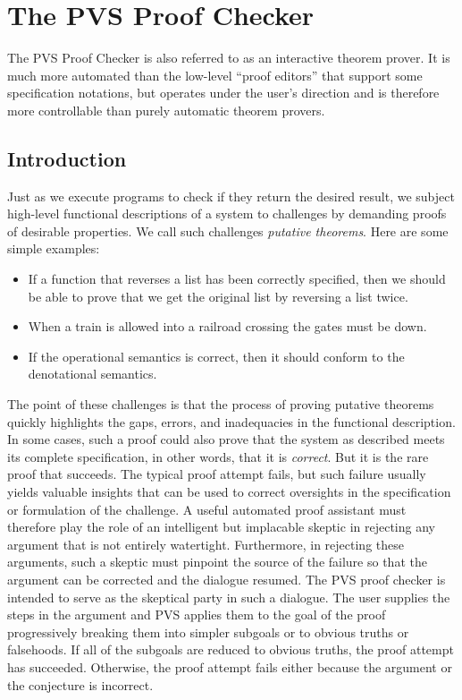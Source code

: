
\section{The PVS Proof Checker}

The PVS Proof Checker is also referred to as an interactive theorem
prover.  It is much more automated than the low-level ``proof
editors'' that support some specification notations, but operates
under the user's direction and is therefore more controllable than
purely automatic theorem provers.


\subsection{Introduction}

Just as we execute programs to check if they return the desired result,
we subject high-level functional descriptions of a system to challenges
by demanding proofs of desirable properties.  We call such challenges
{\em putative theorems}.  Here are some simple examples:
\begin{itemize}
  \item If a function that reverses a list has been
correctly specified, then we should be able to prove that we get the
original list by reversing a list twice.

  \item When a train is allowed into a railroad crossing the gates must
be down.  

  \item If the operational semantics is correct, then it should conform
to the denotational semantics.
\end{itemize}
%
The point of these challenges is that the process of proving putative
theorems quickly highlights the gaps, errors, and inadequacies in the
functional description.  In some cases, such a proof could also prove
that the system as described meets its complete specification, in other
words, that it is {\em correct\/}.  But it is the rare proof that
succeeds.  The typical proof attempt fails, but such failure usually
yields valuable insights that can be used to correct oversights in the
specification or formulation of the challenge.  A useful automated proof
assistant must therefore play the role of an intelligent but implacable
skeptic in rejecting any argument that is not entirely watertight.
Furthermore, in rejecting these arguments, such a skeptic must pinpoint
the source of the failure so that the argument can be corrected and the
dialogue resumed.  The PVS proof checker is intended to serve as the
skeptical party in such a dialogue.  The user supplies the steps in the
argument and PVS applies them to the goal of the proof progressively
breaking them into simpler subgoals or to obvious truths or falsehoods.
If all of the subgoals are reduced to obvious truths, the proof attempt
has succeeded.  Otherwise, the proof attempt fails either because the
argument or the conjecture is incorrect.

